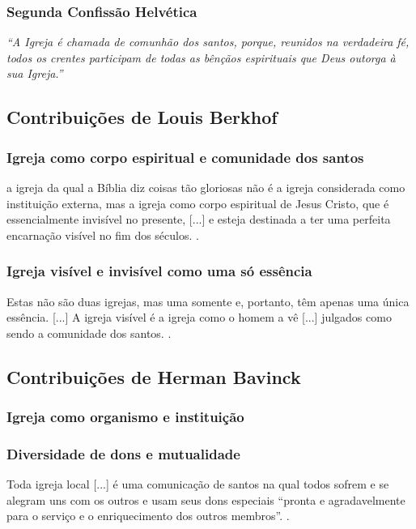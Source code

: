 \subsubsection{Segunda Confissão Helvética} 
\textit{``A Igreja é chamada de comunhão dos santos, porque, reunidos na verdadeira fé, todos os crentes participam de todas as bênçãos espirituais que Deus outorga à sua Igreja.''} \cite{helvetica}

\subsection{Contribuições de Louis Berkhof}

\subsubsection{Igreja como corpo espiritual e comunidade dos santos}
\begin{citacao}
    a igreja da qual a Bíblia diz coisas tão gloriosas não é a igreja considerada como instituição externa, mas a igreja como corpo espiritual de Jesus Cristo, que é essencialmente invisível no presente, [...] e esteja destinada a ter uma perfeita encarnação visível no fim dos séculos. \cite[p. 644]{berkhof2012}.
\end{citacao}

\subsubsection{Igreja visível e invisível como uma só essência}
\begin{citacao}
Estas não são duas igrejas, mas uma somente e, portanto, têm apenas uma única essência. [...] A igreja visível é a igreja como o homem a vê [...] julgados como sendo a comunidade dos santos. \cite[p. 642]{berkhof2012}.
\end{citacao}

\subsection{Contribuições de Herman Bavinck}

\subsubsection{Igreja como organismo e instituição}

\subsubsection{Diversidade de dons e mutualidade}
\begin{citacao}
Toda igreja local [...] é uma comunicação de santos na qual todos sofrem e se alegram uns com os outros e usam seus dons especiais ``pronta e agradavelmente para o serviço e o enriquecimento dos outros membros''. \cite[p. 380]{bavinck2012}.
\end{citacao}

